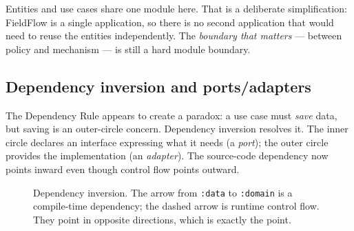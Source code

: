 \documentclass[11pt,a4paper]{article}
\newcommand{\mdl}[1]{\texttt{#1}}
\begin{document}
Entities and use cases share one module here. That is a deliberate
simplification: FieldFlow is a single application, so there is no second
application that would need to reuse the entities independently. The
\emph{boundary that matters} --- between policy and mechanism --- is still a hard
module boundary.

\subsection{Dependency inversion and ports/adapters}

The Dependency Rule appears to create a paradox: a use case must \emph{save}
data, but saving is an outer-circle concern. Dependency inversion resolves it.
The inner circle declares an interface expressing what it needs (a \emph{port});
the outer circle provides the implementation (an \emph{adapter}). The
source-code dependency now points inward even though control flow points
outward.

\begin{figure}[H]
\centering
{}
\caption{Dependency inversion. The arrow from \mdl{:data} to \mdl{:domain} is a
compile-time dependency; the dashed arrow is runtime control flow. They point in
opposite directions, which is exactly the point.}
\end{figure}
\end{document}

